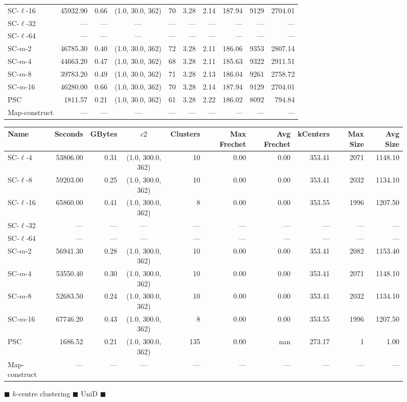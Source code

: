 \documentclass[11pt]{article}
\begin{document}
\begin{figure}
\begin{center}
\begin{minipage}{\textwidth}
{\begin{tabular}{@{}lrrcrrrrrr@{}}
    SC-$\ell$-16 & 45932.90 & 0.66 & (1.0, 30.0, 362) & 70 & 3.28 & 2.14 & 187.94 & 9129 & 2704.01\\
    SC-$\ell$-32 & --- & --- & --- & --- & --- & --- & --- & --- & ---\\
    SC-$\ell$-64 & --- & --- & --- & --- & --- & --- & --- & --- & ---\\
    SC-$m$-2 & 46785.30 & 0.40 & (1.0, 30.0, 362) & 72 & 3.28 & 2.11 & 186.06 & 9353 & 2807.14\\
    SC-$m$-4 & 44663.20 & 0.47 & (1.0, 30.0, 362) & 68 & 3.28 & 2.11 & 185.63 & 9322 & 2911.51\\
    SC-$m$-8 & 39783.20 & 0.49 & (1.0, 30.0, 362) & 71 & 3.28 & 2.13 & 186.04 & 9261 & 2758.72\\
    SC-$m$-16 & 46280.00 & 0.66 & (1.0, 30.0, 362) & 70 & 3.28 & 2.14 & 187.94 & 9129 & 2704.01\\
    PSC & 1811.57 & 0.21 & (1.0, 30.0, 362) & 61 & 3.28 & 2.22 & 186.02 & 8092 & 794.84\\
    Map-construct & --- & --- & --- & --- & --- & --- & --- & --- & ---\\
    \bottomrule
\end{tabular}
}
{
\begin{tabular}{@{}lrrcrrrrrr@{}}
    \toprule
    Name & Seconds & GBytes & $c2$ & Clusters & Max Frechet & Avg Frechet & kCenters & Max Size & Avg Size\\
    \midrule
    SC-$\ell$-4 & 53806.00 & 0.31 & (1.0, 300.0, 362) & 10 & 0.00 & 0.00 & 353.41 & 2071 & 1148.10\\
    SC-$\ell$-8 & 59203.00 & 0.25 & (1.0, 300.0, 362) & 10 & 0.00 & 0.00 & 353.41 & 2032 & 1134.10\\
    SC-$\ell$-16 & 65860.00 & 0.41 & (1.0, 300.0, 362) & 8 & 0.00 & 0.00 & 353.55 & 1996 & 1207.50\\
    SC-$\ell$-32 & --- & --- & --- & --- & --- & --- & --- & --- & ---\\
    SC-$\ell$-64 & --- & --- & --- & --- & --- & --- & --- & --- & ---\\
    SC-$m$-2 & 56941.30 & 0.28 & (1.0, 300.0, 362) & 10 & 0.00 & 0.00 & 353.41 & 2082 & 1153.40\\
    SC-$m$-4 & 53550.40 & 0.30 & (1.0, 300.0, 362) & 10 & 0.00 & 0.00 & 353.41 & 2071 & 1148.10\\
    SC-$m$-8 & 52683.50 & 0.24 & (1.0, 300.0, 362) & 10 & 0.00 & 0.00 & 353.41 & 2032 & 1134.10\\
    SC-$m$-16 & 67746.20 & 0.43 & (1.0, 300.0, 362) & 8 & 0.00 & 0.00 & 353.55 & 1996 & 1207.50\\
    PSC & 1686.52 & 0.21 & (1.0, 300.0, 362) & 135 & 0.00 & nan & 273.17 & 1 & 1.00\\
    Map-construct & --- & --- & --- & --- & --- & --- & --- & --- & ---\\
    \bottomrule
\end{tabular}
}
\end{minipage}
\end{center}
    \caption{$\blacksquare$ $k$-centre clustering $\blacksquare$ UniD $\blacksquare$}
\end{figure}
\end{document}
